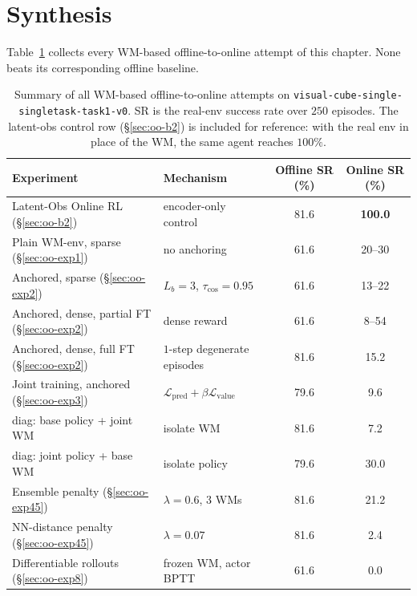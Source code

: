 \section{Synthesis}
\label{sec:oo-synthesis}

Table~\ref{tab:oo-summary} collects every WM-based offline-to-online attempt of this chapter. None beats its corresponding offline baseline.

\begin{table}[h]
\centering
\caption{Summary of all WM-based offline-to-online attempts on
   \texttt{visual-cube-single-singletask-task1-v0}. SR is the
   real-env success rate over $250$ episodes. The latent-obs control
   row (\S\ref{sec:oo-b2}) is included for reference: with the real env
   in place of the WM, the same agent reaches $100\%$.}
\label{tab:oo-summary}
\begin{tabular}{l l c c}
\toprule
Experiment & Mechanism & Offline SR (\%) & Online SR (\%) \\
\midrule
Latent-Obs Online RL (\S\ref{sec:oo-b2})       & encoder-only control                       & 81.6 & \textbf{100.0} \\
\midrule
Plain WM-env, sparse (\S\ref{sec:oo-exp1})       & no anchoring                       & 61.6 & 20--30 \\
Anchored, sparse (\S\ref{sec:oo-exp2})           & $L_b{=}3$, $\tau_{\cos}{=}0.95$    & 61.6 & 13--22 \\
Anchored, dense, partial FT (\S\ref{sec:oo-exp2})& dense reward                       & 61.6 & 8--54  \\
Anchored, dense, full FT (\S\ref{sec:oo-exp2})   & $1$-step degenerate episodes       & 81.6 & 15.2   \\
Joint training, anchored (\S\ref{sec:oo-exp3})   & $\mathcal{L}_{\text{pred}}+\beta\mathcal{L}_{\text{value}}$ & 79.6 & 9.6    \\
\quad diag: base policy + joint WM               & isolate WM                         & 81.6 & 7.2    \\
\quad diag: joint policy + base WM               & isolate policy                     & 79.6 & 30.0   \\
Ensemble penalty (\S\ref{sec:oo-exp45})          & $\lambda{=}0.6$, $3$ WMs            & 81.6 & 21.2   \\
NN-distance penalty (\S\ref{sec:oo-exp45})       & $\lambda{=}0.07$                    & 81.6 & 2.4    \\
Differentiable rollouts (\S\ref{sec:oo-exp8})    & frozen WM, actor BPTT               & 61.6 & 0.0    \\
\bottomrule
\end{tabular}
\end{table}

